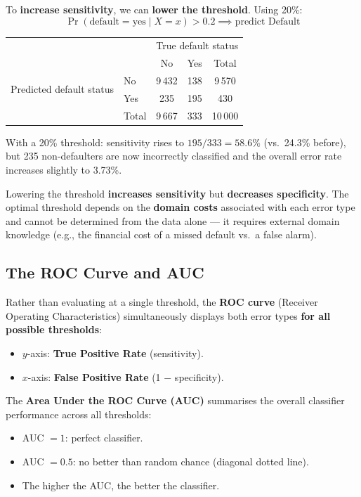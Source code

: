 \documentclass[11pt,a4paper]{article}
\theoremstyle{definition}
\theoremstyle{plain}
\theoremstyle{remark}
\begin{document}
To \textbf{increase sensitivity}, we can \textbf{lower the threshold}. Using 20\%:
\[
    \Pr(\text{default} = \text{yes} \mid X = x) > 0.2 \implies \text{predict Default}
\]

\begin{center}
\begin{tabular}{llccc}
\hline
 & & \multicolumn{3}{c}{True default status} \\
 & & No & Yes & Total \\
\hline
\multirow{2}{*}{Predicted default status} & No  & 9\,432 & 138 & 9\,570 \\
                                           & Yes & 235    & 195 & 430    \\
\hline
 & Total & 9\,667 & 333 & 10\,000 \\
\hline
\end{tabular}
\end{center}

With a 20\% threshold: sensitivity rises to $195/333 = 58.6\%$ (vs.\ 24.3\% before), but 235 non-defaulters are now incorrectly classified and the overall error rate increases slightly to 3.73\%.

\begin{tcolorbox}[colback=orange!5!white,colframe=orange!75!black,title=\textbf{Threshold Trade-off}]
Lowering the threshold \textbf{increases sensitivity} but \textbf{decreases specificity}. The optimal threshold depends on the \textbf{domain costs} associated with each error type and cannot be determined from the data alone — it requires external domain knowledge (e.g., the financial cost of a missed default vs.\ a false alarm).
\end{tcolorbox}

\subsection{The ROC Curve and AUC}

Rather than evaluating at a single threshold, the \textbf{ROC curve} (Receiver Operating Characteristics) simultaneously displays both error types \textbf{for all possible thresholds}:
\begin{itemize}
    \item $y$-axis: \textbf{True Positive Rate} (sensitivity).
    \item $x$-axis: \textbf{False Positive Rate} (1 $-$ specificity).
\end{itemize}

The \textbf{Area Under the ROC Curve (AUC)} summarises the overall classifier performance across all thresholds:
\begin{itemize}
    \item AUC $= 1$: perfect classifier.
    \item AUC $= 0.5$: no better than random chance (diagonal dotted line).
    \item The higher the AUC, the better the classifier.
\end{itemize}
\end{document}

